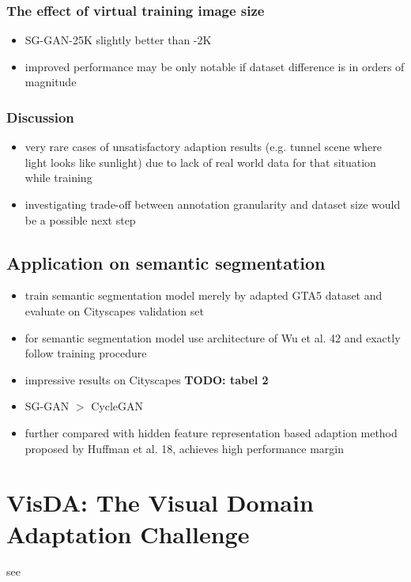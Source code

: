 \documentclass[]{article}
\newcommand{\todo}[1]{{\color{red}\bf{TODO: #1}}}
\begin{document}
\subsubsection{The effect of virtual training image size}
\begin{itemize}
	\item SG-GAN-25K slightly better than -2K
	\item improved performance may be only notable if dataset difference is in orders of magnitude
\end{itemize}

\subsubsection{Discussion}
\begin{itemize}
	\item very rare cases of unsatisfactory adaption results (e.g. tunnel scene where light looks like sunlight) due to lack of real world data for that situation while training
	\item investigating trade-off between annotation granularity and dataset size would be a possible next step
\end{itemize}

\subsection{Application on semantic segmentation}
\begin{itemize}
	\item train semantic segmentation model merely by adapted GTA5 dataset and evaluate on Cityscapes validation set
	\item for semantic segmentation model use architecture of Wu et al. 42 and exactly follow training procedure
	\item impressive results on Cityscapes \todo{tabel 2}
	\item SG-GAN $>$ CycleGAN
	\item further compared with hidden feature representation based adaption method proposed by Huffman et al. 18, achieves high performance margin
\end{itemize}


\section{VisDA: The Visual Domain Adaptation Challenge}

see \cite{DBLP:journals/corr/abs-1710-06924}
\end{document}
